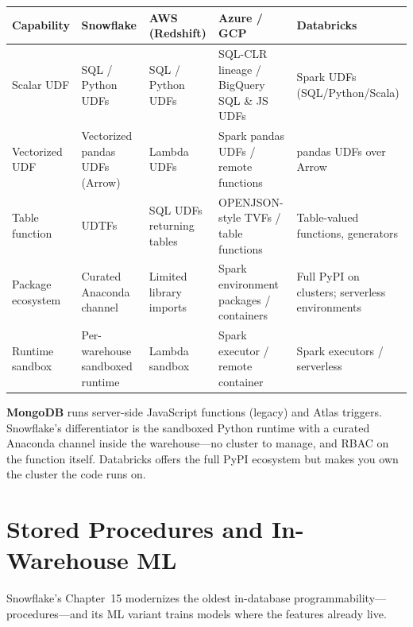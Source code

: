 \begin{center}
\footnotesize
\begin{tabular}{@{}p{2.5cm}p{2.9cm}p{2.7cm}p{2.9cm}p{2.9cm}@{}}
\toprule
\textbf{Capability} & \textbf{Snowflake} & \textbf{AWS (Redshift)} & \textbf{Azure / GCP} & \textbf{Databricks} \\
\midrule
Scalar UDF & SQL / Python UDFs & SQL / Python UDFs & SQL-CLR lineage / BigQuery SQL \& JS UDFs & Spark UDFs (SQL/Python/Scala) \\
Vectorized UDF & Vectorized pandas UDFs (Arrow) & Lambda UDFs & Spark pandas UDFs / remote functions & pandas UDFs over Arrow \\
Table function & UDTFs & SQL UDFs returning tables & OPENJSON-style TVFs / table functions & Table-valued functions, generators \\
Package ecosystem & Curated Anaconda channel & Limited library imports & Spark environment packages / containers & Full PyPI on clusters; serverless environments \\
Runtime sandbox & Per-warehouse sandboxed runtime & Lambda sandbox & Spark executor / remote container & Spark executors / serverless \\
\bottomrule
\end{tabular}
\end{center}

\noindent \textbf{MongoDB} runs server-side JavaScript functions (legacy) and Atlas triggers.
Snowflake's differentiator is the sandboxed Python runtime with a curated Anaconda channel
inside the warehouse---no cluster to manage, and RBAC on the function itself. Databricks offers
the full PyPI ecosystem but makes you own the cluster the code runs on.

\section{Stored Procedures and In-Warehouse ML}
%
Snowflake's Chapter~15 modernizes the oldest in-database programmability---procedures---and its
ML variant trains models where the features already live.

